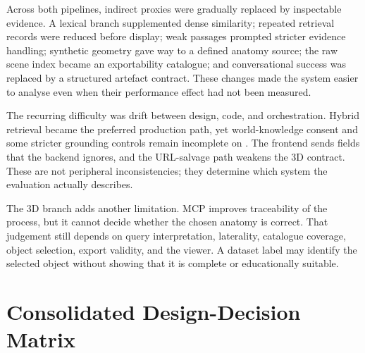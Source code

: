 Across both pipelines, indirect proxies were gradually replaced by inspectable evidence. A lexical branch supplemented dense similarity; repeated retrieval records were reduced before display; weak passages prompted stricter evidence handling; synthetic geometry gave way to a defined anatomy source; the raw scene index became an exportability catalogue; and conversational success was replaced by a structured artefact contract. These changes made the system easier to analyse even when their performance effect had not been measured.

The recurring difficulty was drift between design, code, and orchestration. Hybrid retrieval became the preferred production path, yet world-knowledge consent and some stricter grounding controls remain incomplete on . The frontend sends fields that the backend ignores, and the URL-salvage path weakens the 3D contract. These are not peripheral inconsistencies; they determine which system the evaluation actually describes.

The 3D branch adds another limitation. MCP improves traceability of the process, but it cannot decide whether the chosen anatomy is correct. That judgement still depends on query interpretation, laterality, catalogue coverage, object selection, export validity, and the viewer. A dataset label may identify the selected object without showing that it is complete or educationally suitable.

\section{Consolidated Design-Decision Matrix}
\label{sec:evolution-matrix}

